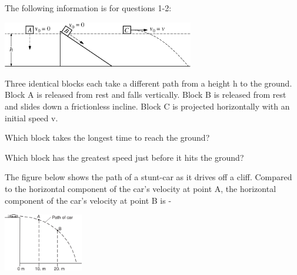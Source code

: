 \documentclass[10pt]{examdesign}
\begin{document}
\begin{multiplechoice} [title={Multiple Choice},
	rearrange=no]
	
\begin{block}
	The following information is for questions 1-2:
	
	
		\includegraphics[height=2cm]{blocks.png}
		
Three identical blocks each take a different path from a height h to the ground.  Block A is released from rest and falls vertically.  Block B is released from rest and slides down a frictionless incline.  Block C is projected horizontally with an initial speed v.  
	

\begin{question}
Which block takes the longest time to reach the ground?

	\end{question}

\begin{question}
Which block has the greatest speed just before it hits the ground?
	\end{question}



\end{block}

\begin{question}
The figure below shows the path of a stunt-car as it drives off a cliff.  Compared to the horizontal component of the car's velocity at point A, the horizontal component of the car's velocity at point B is - 

	\hspace{3in} \includegraphics[height=2.5cm]{car.png}
\vspace{-.7in}
\end{question}



\end{multiplechoice}
\end{document}
